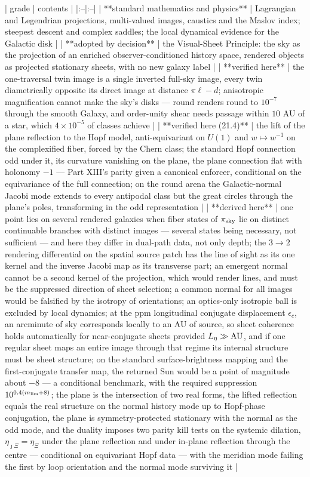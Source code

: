 | grade | contents |
|:--|:--|
| **standard mathematics and physics** | Lagrangian and Legendrian projections, multi-valued images, caustics and the Maslov index; steepest descent and complex saddles; the local dynamical evidence for the Galactic disk |
| **adopted by decision** | the Visual-Sheet Principle: the sky as the projection of an enriched observer-conditioned history space, rendered objects as projected stationary sheets, with no new galaxy label |
| **verified here** | the one-traversal twin image is a single inverted full-sky image, every twin diametrically opposite its direct image at distance $\pi\ell-d$; anisotropic magnification cannot make the sky's disks — round renders round to $10^{-7}$ through the smooth Galaxy, and order-unity shear needs passage within $10$ AU of a star, which $4\times10^{-5}$ of classes achieve |
| **verified here (21.4)** | the lift of the plane reflection to the Hopf model, anti-equivariant on $U(1)$ and $w\mapsto w^{-1}$ on the complexified fiber, forced by the Chern class; the standard Hopf connection odd under it, its curvature vanishing on the plane, the plane connection flat with holonomy $-1$ — Part XIII's parity given a canonical enforcer, conditional on the equivariance of the full connection; on the round arena the Galactic-normal Jacobi mode extends to every antipodal class but the great circles through the plane's poles, transforming in the odd representation |
| **derived here** | one point lies on several rendered galaxies when fiber states of $\pi_{\rm sky}$ lie on distinct continuable branches with distinct images — several states being necessary, not sufficient — and here they differ in dual-path data, not only depth; the $3\to2$ rendering differential on the spatial source patch has the line of sight as its one kernel and the inverse Jacobi map as its transverse part; an emergent normal cannot be a second kernel of the projection, which would render lines, and must be the suppressed direction of sheet selection; a common normal for all images would be falsified by the isotropy of orientations; an optics-only isotropic ball is excluded by local dynamics; at the ppm longitudinal conjugate displacement $\epsilon_c$, an arcminute of sky corresponds locally to an AU of source, so sheet coherence holds automatically for near-conjugate sheets provided $L_\eta\gg{\rm AU}$, and if one regular sheet maps an entire image through that regime its internal structure must be sheet structure; on the standard surface-brightness mapping and the first-conjugate transfer map, the returned Sun would be a point of magnitude about $-8$ — a conditional benchmark, with the required suppression $10^{0.4(m_{\rm lim}+8)}$; the plane is the intersection of two real forms, the lifted reflection equals the real structure on the normal history mode up to Hopf-phase conjugation, the plane is symmetry-protected stationary with the normal as the odd mode, and the duality imposes two parity kill tests on the systemic dilation, $\eta_{\jmath\Xi} = \eta_\Xi$ under the plane reflection and under in-plane reflection through the centre — conditional on equivariant Hopf data — with the meridian mode failing the first by loop orientation and the normal mode surviving it |
